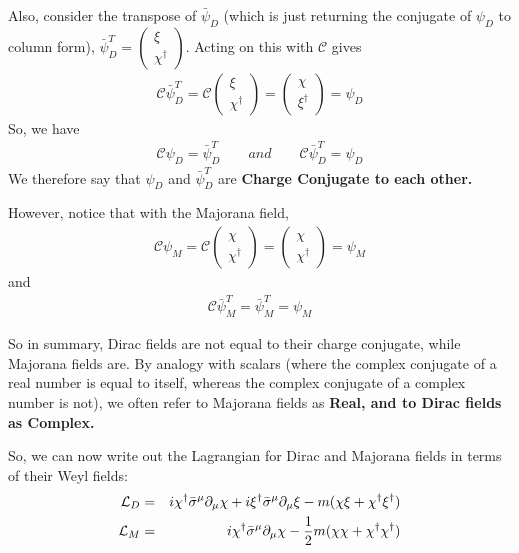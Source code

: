 \documentclass[12pt,epsf]{article}
\def\nolabel{\nonumber }
\def\nolabel{\nonumber }
\begin{document}
Also, consider the transpose of $\bar \psi_D$ (which is just returning
the conjugate of $\psi_D$ to column form), $\bar \psi^T_D = 
\begin{pmatrix}
\xi \\ \chi^{\dagger}
\end{pmatrix}$.  Acting on this with $\mathcal{C}$ gives 
\begin{eqnarray}
\mathcal{C}\bar \psi^T_D = \mathcal{C}
\begin{pmatrix}
\xi \\ \chi^{\dagger}
\end{pmatrix} = 
\begin{pmatrix}
\chi \\ \xi^{\dagger}
\end{pmatrix} = \psi_D\nolabel
\end{eqnarray}
So, we have 
\begin{eqnarray}
\mathcal{C}\psi_D = \bar \psi^T_D \qquad and \qquad \mathcal{C}\bar
\psi^T_D = \psi_D\nolabel
\end{eqnarray}
We therefore say that $\psi_D$ and $\bar \psi_D^T$ are \bf Charge
Conjugate \rm to each other.  

However, notice that with the Majorana field,
\begin{eqnarray}
\mathcal{C}\psi_M = \mathcal{C}
\begin{pmatrix}
\chi \\ \chi^{\dagger}
\end{pmatrix} = 
\begin{pmatrix}
\chi \\ \chi^{\dagger}
\end{pmatrix} = \psi_M\nolabel
\end{eqnarray}
and
\begin{eqnarray}
\mathcal{C}\bar \psi^T_M = \bar \psi_M^T = \psi_M\nolabel
\end{eqnarray}

So in summary, Dirac fields are not equal to their charge conjugate,
while Majorana fields are.  By analogy with scalars (where the complex
conjugate of a real number is equal to itself, whereas the complex
conjugate of a complex number is not), we often refer to Majorana
fields as \bf Real\rm, and to Dirac fields as \bf Complex\rm.  

So, we can now write out the Lagrangian for Dirac and Majorana fields
in terms of their Weyl fields:
\begin{eqnarray}
\mathcal{L}_D &=& i \chi^{\dagger} \bar \sigma^{\mu} \partial_{\mu}
\chi + i \xi^{\dagger}\bar \sigma^{\mu}\partial_{\mu} \xi - m(\chi \xi
+ \chi^{\dagger}\xi^{\dagger}) \label{eq:erty1} \\
\mathcal{L}_M &=& i\chi^{\dagger} \bar \sigma^{\mu}\partial_{\mu} \chi
- {1\over 2} m(\chi \chi + \chi^{\dagger}\chi^{\dagger})
\label{eq:erty2}
\end{eqnarray}
\end{document}
